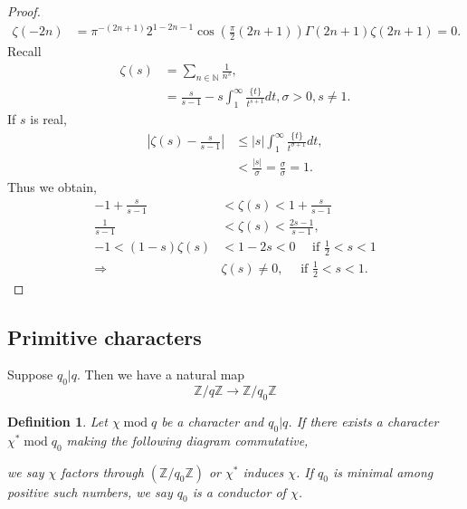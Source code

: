 \documentclass{article}
\newtheorem{definition}{Definition}[section]
\DeclareMathOperator{\tmod}{mod}
\newcommand{\N}[0]{\mathbb{N}}
\newcommand{\Z}[0]{\mathbb{Z}}
\newcommand{\C}[0]{\mathbb{C}}
\begin{document}
\begin{proof}
  \begin{align*}
    \zeta(-2n) & = \pi^{-(2n+1)}2^{1-2n-1}\cos\left({\frac \pi 2}(2n+1)\right)\Gamma(2n+1)\zeta(2n+1)=0.
  \end{align*}
  Recall \begin{align*}
  \zeta(s) & = \sum_{n\in\N}{\frac 1 {n^s}},\\
  & = {\frac s {s-1}}-s\int_1^\infty {\frac {\{t\}} {t^{s+1}}}dt, \sigma>0,s\not=1.
  \end{align*}
  If $s$ is real,
  \begin{align*}
  \left\vert \zeta(s)-{\frac s {s-1}}\right\vert &\leq \vert s\vert\int_1^\infty {\frac {\{t\}} {t^{\sigma+1}}}dt,\\
  & < {\frac {\vert s\vert }\sigma} = {\frac \sigma \sigma}=1.
  \end{align*}
  Thus we obtain,
  \begin{align*}
  -1+{\frac s {s-1}}&<\zeta(s)<1+{\frac s {s-1}}\\
    {\frac 1 {s-1}}&<\zeta(s)<{\frac {2s-1} {s-1}},\\
    -1<(1-s)\zeta(s)&<1-2s<0\quad\text{ if } {\frac 1 2}<s<1\\
    \Rightarrow & \zeta(s)\not=0,\quad \text{ if } {\frac 1 2}<s<1.
  \end{align*}
\end{proof}


\subsection{Primitive characters}
Suppose $q_0|q$. Then we have a natural map 
\begin{equation*}
  \Z/q\Z\to \Z/q_0\Z
\end{equation*}

\begin{definition}
  Let $\chi\tmod{q}$ be a character and $q_0|q$. If there exists a character $\chi^*\tmod{q_0}$ making the following diagram commutative, 
  \begin{center}
  \end{center}
  we say $\chi$ factors through $(\Z/q_0\Z)$ or $\chi^*$ induces $\chi$. If $q_0$ is minimal among positive such numbers, we say $q_0$ is a conductor of $\chi$.
\end{definition}
\end{document}
